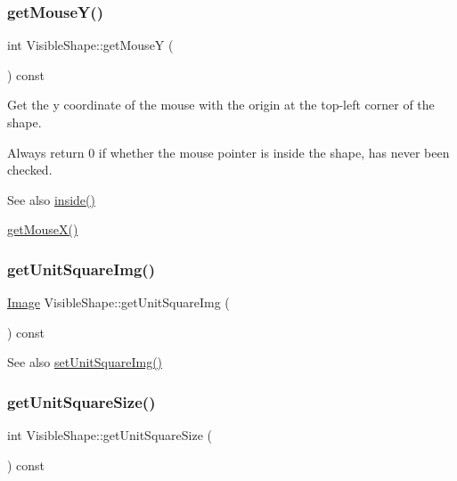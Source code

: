 \subsubsection{\texorpdfstring{get\+Mouse\+Y()}{getMouseY()}}
{\footnotesize\ttfamily int Visible\+Shape\+::get\+MouseY (\begin{DoxyParamCaption}{ }\end{DoxyParamCaption}) const\hspace{0.3cm}{\ttfamily [virtual]}}



Get the y coordinate of the mouse with the origin at the top-\/left corner of the shape. 

Always return 0 if whether the mouse pointer is inside the shape, has never been checked. \begin{DoxySeeAlso}{See also}
\mbox{\hyperlink{class_visible_shape_aab5199578030849314f0c6a339aa4281}{inside()}} 

\mbox{\hyperlink{class_visible_shape_a53dd71f6cee05f9707d899c4e1434070}{get\+Mouse\+X()}} 
\end{DoxySeeAlso}
\mbox{\label{class_visible_shape_ab62a8320e8084bfdcc43b5c3cf072cd3}} 
\subsubsection{\texorpdfstring{get\+Unit\+Square\+Img()}{getUnitSquareImg()}}
{\footnotesize\ttfamily \mbox{\hyperlink{class_image}{Image}} Visible\+Shape\+::get\+Unit\+Square\+Img (\begin{DoxyParamCaption}{ }\end{DoxyParamCaption}) const\hspace{0.3cm}{\ttfamily [virtual]}}

\begin{DoxySeeAlso}{See also}
\mbox{\hyperlink{class_visible_shape_ae0b09cac51ba9af744cddce67fe0180a}{set\+Unit\+Square\+Img()}} 
\end{DoxySeeAlso}
\mbox{\label{class_visible_shape_a76955574eac9a5e205a2746b1343deb4}} 
\subsubsection{\texorpdfstring{get\+Unit\+Square\+Size()}{getUnitSquareSize()}}
{\footnotesize\ttfamily int Visible\+Shape\+::get\+Unit\+Square\+Size (\begin{DoxyParamCaption}{ }\end{DoxyParamCaption}) const\hspace{0.3cm}{\ttfamily [virtual]}}




